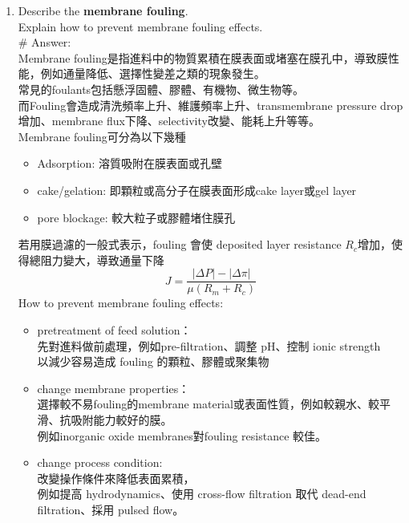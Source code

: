 ﻿\documentclass[12pt,a4paper]{article}
\begin{document}
\begin{problems}
\begin{enumerate}
膜長得不一樣：用的是完全沒有孔的Dense, nonporous selective layer\\
推動力不一樣：推動力是膜兩邊的Chemical potential、活性或 Partial pressure的差異\\
狀態不一樣：透過端會發生 Evaporation變成氣體
\item Describe the \textbf{membrane fouling}.\\
Explain how to prevent membrane fouling effects.\\
\# Answer:\\
Membrane fouling是指進料中的物質累積在膜表面或堵塞在膜孔中，導致膜性能，例如通量降低、選擇性變差之類的現象發生。\\
常見的foulants包括懸浮固體、膠體、有機物、微生物等。\\
而Fouling會造成清洗頻率上升、維護頻率上升、transmembrane pressure drop增加、membrane flux下降、selectivity改變、能耗上升等等。\\
Membrane fouling可分為以下幾種
\begin{itemize}
  \item Adsorption: 溶質吸附在膜表面或孔壁
  \item cake/gelation: 即顆粒或高分子在膜表面形成cake layer或gel layer
  \item pore blockage: 較大粒子或膠體堵住膜孔
\end{itemize}
若用膜過濾的一般式表示，fouling 會使 deposited layer resistance $R_c$增加，使得總阻力變大，導致通量下降
\begin{equation}
  J = \frac{\left|\Delta P\right|-\left|\Delta \pi\right|}{\mu(R_m + R_c)}
\end{equation}
How to prevent membrane fouling effects:
\begin{itemize}
  \item pretreatment of feed solution：\\
  先對進料做前處理，例如pre-filtration、調整 pH、控制 ionic strength\\
  以減少容易造成 fouling 的顆粒、膠體或聚集物
  \item change membrane properties：\\
  選擇較不易fouling的membrane material或表面性質，例如較親水、較平滑、抗吸附能力較好的膜。\\
  例如inorganic oxide membranes對fouling resistance 較佳。
  \item change process condition:\\
  改變操作條件來降低表面累積，\\
  例如提高 hydrodynamics、使用 cross-flow filtration 取代 dead-end filtration、採用 pulsed flow。\\

\end{itemize}
\end{enumerate}
\end{problems}
\end{document}
